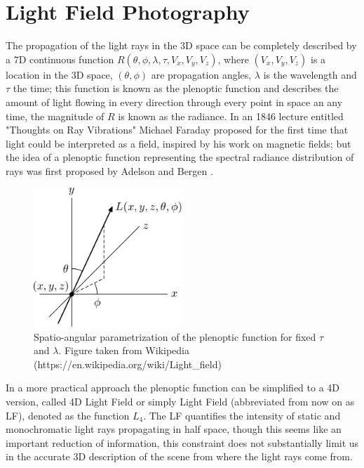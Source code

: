 
\chapter{Light Field Photography}

The propagation of the light rays in the 3D space can be completely described by a 7D continuous function $R(\theta,\phi,\lambda,\tau,V_x,V_y,V_z)$, where $(V_x,V_y,V_z)$ is a location in the 3D space, $(\theta,\phi)$ are propagation angles, $\lambda$ is the wavelength and $\tau$ the time; this function is known as the plenoptic function and describes the amount of light flowing in every direction through every point in space an any time, the magnitude of $R$ is known as the radiance.  In an 1846 lecture entitled "Thoughts on Ray Vibrations" Michael Faraday proposed for the first time that light could be interpreted as a field, inspired by his work on magnetic fields; but the idea of a plenoptic function representing the spectral radiance distribution of rays was first proposed by Adelson and Bergen \cite{Adelson-Plenoptic}. 

\bigskip

\begin{figure}[h!]
\centering
\includegraphics[width=0.5\textwidth]{./Diagrams/Plenoptic_function.jpg}
\caption{Spatio-angular parametrization of the plenoptic function for fixed $\tau$ and $\lambda$. Figure taken from Wikipedia (https://en.wikipedia.org/wiki/Light\_field)}
\end{figure}

\bigskip

In a more practical approach the plenoptic function can be simplified to a 4D version, called 4D Light Field or simply Light Field (abbreviated from now on as LF), denoted as the function $L_4$. The LF quantifies the intensity of static and monochromatic light rays propagating in half space, though this seems like an important reduction of information, this constraint does not substantially limit us in the accurate 3D description of the scene from where the light rays come from.

